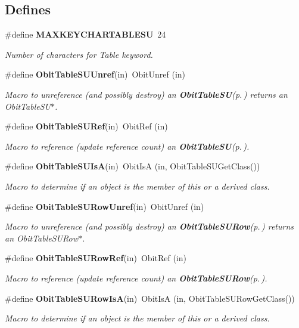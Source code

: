 \subsection*{Defines}
\begin{CompactItemize}
\item 
\#define {\bf MAXKEYCHARTABLESU}\ 24
\begin{CompactList}\small\item\em Number of characters for Table keyword. \item\end{CompactList}\item 
\#define {\bf Obit\-Table\-SUUnref}(in)\ Obit\-Unref (in)
\begin{CompactList}\small\item\em Macro to unreference (and possibly destroy) an {\bf Obit\-Table\-SU}{\rm (p.\,\pageref{structObitTableSU})} returns an Obit\-Table\-SU$\ast$. \item\end{CompactList}\item 
\#define {\bf Obit\-Table\-SURef}(in)\ Obit\-Ref (in)
\begin{CompactList}\small\item\em Macro to reference (update reference count) an {\bf Obit\-Table\-SU}{\rm (p.\,\pageref{structObitTableSU})}. \item\end{CompactList}\item 
\#define {\bf Obit\-Table\-SUIs\-A}(in)\ Obit\-Is\-A (in, Obit\-Table\-SUGet\-Class())
\begin{CompactList}\small\item\em Macro to determine if an object is the member of this or a derived class. \item\end{CompactList}\item 
\#define {\bf Obit\-Table\-SURow\-Unref}(in)\ Obit\-Unref (in)
\begin{CompactList}\small\item\em Macro to unreference (and possibly destroy) an {\bf Obit\-Table\-SURow}{\rm (p.\,\pageref{structObitTableSURow})} returns an Obit\-Table\-SURow$\ast$. \item\end{CompactList}\item 
\#define {\bf Obit\-Table\-SURow\-Ref}(in)\ Obit\-Ref (in)
\begin{CompactList}\small\item\em Macro to reference (update reference count) an {\bf Obit\-Table\-SURow}{\rm (p.\,\pageref{structObitTableSURow})}. \item\end{CompactList}\item 
\#define {\bf Obit\-Table\-SURow\-Is\-A}(in)\ Obit\-Is\-A (in, Obit\-Table\-SURow\-Get\-Class())
\begin{CompactList}\small\item\em Macro to determine if an object is the member of this or a derived class. \item\end{CompactList}\end{CompactItemize}
